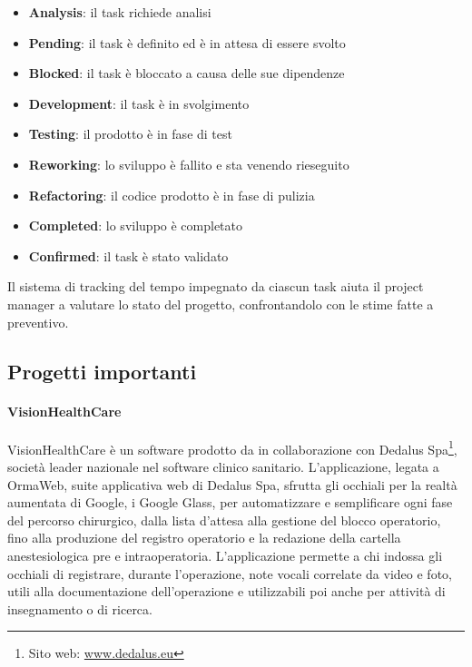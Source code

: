    \begin{itemize}
      \item{\textbf{Analysis}: il task richiede analisi}
      \item{\textbf{Pending}: il task è definito ed è in attesa di essere svolto}
      \item{\textbf{Blocked}: il task è bloccato a causa delle sue dipendenze}
      \item{\textbf{Development}: il task è in svolgimento}
      \item{\textbf{Testing}: il prodotto è in fase di test}
      \item{\textbf{Reworking}: lo sviluppo è fallito e sta venendo rieseguito}
      \item{\textbf{Refactoring}: il codice prodotto è in fase di pulizia}
      \item{\textbf{Completed}: lo sviluppo è completato}
      \item{\textbf{Confirmed}: il task è stato validato}
   \end{itemize}
   Il sistema di tracking del tempo impegnato da ciascun task aiuta il project manager a valutare lo stato del progetto, confrontandolo con le stime fatte a preventivo.

   \subsection{Progetti importanti}
   \paragraph{VisionHealthCare}
   VisionHealthCare è un software prodotto da \nomeAzienda{} in collaborazione con Dedalus Spa\footnote{Sito web: \href{www.dedalus.eu}{www.dedalus.eu}}, società leader nazionale nel software clinico sanitario. L'applicazione, legata a OrmaWeb, suite applicativa web di Dedalus Spa, sfrutta gli occhiali per la realtà aumentata di Google, i Google Glass, per automatizzare e semplificare ogni fase del percorso chirurgico, dalla lista d'attesa alla gestione del blocco operatorio, fino alla produzione del registro operatorio e la redazione della cartella anestesiologica pre e intraoperatoria. L'applicazione permette a chi indossa gli occhiali di registrare, durante l'operazione, note vocali correlate da video e foto, utili alla documentazione dell'operazione e utilizzabili poi anche per attività di insegnamento o di ricerca.

